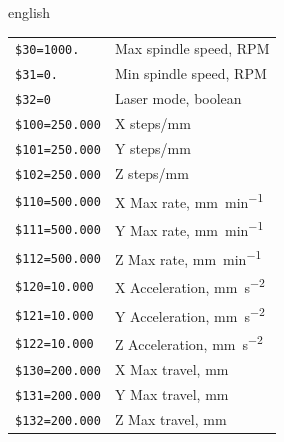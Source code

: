 \begin{table}[H]
\begin{otherlanguage*}{english}
\begin{tabular}{ll}
            \verb|$30=1000.|            & Max spindle speed, RPM \\
            \verb|$31=0.|               & Min spindle speed, RPM \\
            \verb|$32=0|                & Laser mode, boolean \\
            \verb|$100=250.000|         & X steps/mm \\
            \verb|$101=250.000|         & Y steps/mm \\
            \verb|$102=250.000|         & Z steps/mm \\
            \verb|$110=500.000|         & X Max rate, \si{\milli\meter\per\minute} \\
            \verb|$111=500.000|         & Y Max rate, \si{\milli\meter\per\minute} \\
            \verb|$112=500.000|         & Z Max rate, \si{\milli\meter\per\minute} \\
            \verb|$120=10.000|          & X Acceleration, \si{\milli\meter\per\second\squared} \\
            \verb|$121=10.000|          & Y Acceleration, \si{\milli\meter\per\second\squared} \\
            \verb|$122=10.000|          & Z Acceleration, \si{\milli\meter\per\second\squared} \\
            \verb|$130=200.000|         & X Max travel, \si{\milli\meter} \\
            \verb|$131=200.000|         & Y Max travel, \si{\milli\meter} \\
            \verb|$132=200.000|         & Z Max travel, \si{\milli\meter} \\
            \bottomrule
        \end{tabular}
    \end{otherlanguage*}
\end{table}



\clearpage
{}
\label{app:update ha}




